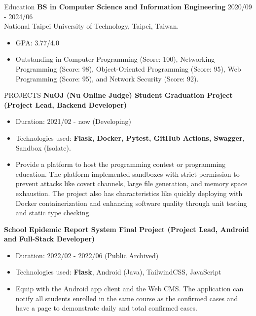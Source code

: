 \documentclass{resume} %
\begin{document}

\begin{rSection}{Education}
{\bf BS in Computer Science and Information Engineering} \hfill {2020/09 - 2024/06} \\
{National Taipei University of Technology, Taipei, Taiwan.}
\begin{itemize}
  \item GPA: 3.77/4.0
  \item {
    Outstanding in Computer Programming (Score: 100), 
    Networking Programming (Score: 98), 
    Object-Oriented Programming (Score: 95), 
    Web Programming (Score: 95),
    and Network Security (Score: 92).
  }
\end{itemize}
\end{rSection}

\begin{rSection}{PROJECTS}
{\bf NuOJ (Nu Online Judge) \hfill {Student Graduation Project (Project Lead, Backend Developer)}}
    \begin{itemize}
        \item {Duration: 2021/02 - now (Developing)}
        \item {Technologies used: {\bf Flask, Docker, Pytest, GitHub Actions, Swagger}, Sandbox (Isolate).}
        \item {Provide a platform to host the programming contest or programming education. The platform implemented sandboxes with strict permission to prevent attacks like covert channels, large file generation, and memory space exhaustion. The project also has characteristics like quickly deploying with Docker containerization and enhancing software quality through unit testing and static type checking.}
    \end{itemize}

{\bf School Epidemic Report System \hfill {Final Project (Project Lead, Android and Full-Stack Developer)}}
    \begin{itemize}
        \item {Duration: 2022/02 - 2022/06 (Public Archived)}
        \item {Technologies used: {\bf Flask}, Android (Java), TailwindCSS, JavaScript}
        \item {Equip with the Android app client and the Web CMS. The application can notify all students enrolled in the same course as the confirmed cases and have a page to demonstrate daily and total confirmed cases.}
    \end{itemize}
\end{rSection}
\end{document}
